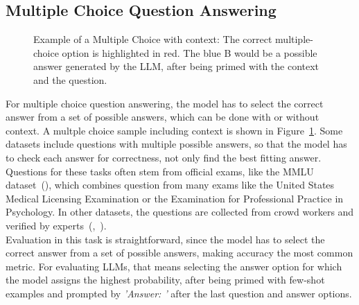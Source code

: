 \subsection{Multiple Choice Question Answering}\label{sec:multiple-choice-qa}
\begin{figure}[h]
    \centering
    \caption{Example of a Multiple Choice with context: The correct multiple-choice option is highlighted in red.
    The blue B would be a possible answer generated by the LLM, after being primed with the context and the question.
    }
    \label{fig:mc_example}
\end{figure}
For multiple choice question answering, the model has to select the correct answer from a set of possible answers, which can be done with or without context.
A multple choice sample including context is shown in Figure~\ref{fig:mc_example}.
Some datasets include questions with multiple possible answers, so that the model has to check each answer for correctness, not only find the best fitting answer.
Questions for these tasks often stem from official exams, like the MMLU dataset~(\cite{hendrycks:2020}), which combines question from many exams like the United States Medical Licensing Examination or the Examination for Professional Practice in Psychology.
In other datasets, the questions are collected from crowd workers and verified by experts~(\cite{clark:2018},~\cite{mihaylov:2018}).
\\
Evaluation in this task is straightforward, since the model has to select the correct answer from a set of possible answers, making accuracy the most common metric.
For evaluating LLMs, that means selecting the answer option for which the model assigns the highest probability, after being primed with few-shot examples and prompted by \emph{'Answer: '} after the last question and answer options.


